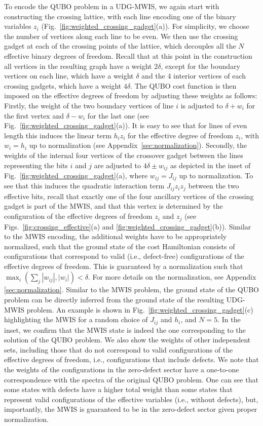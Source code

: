 To encode the QUBO problem in a UDG-MWIS, we again start with constructing the crossing lattice, with each line encoding one of the binary variables $z_i$ (Fig.~\ref{fig:weighted_crossing_gadget}(a)). For simplicity, we choose the number of vertices along each line to be even.
We then use the crossing gadget at each of the crossing points of the lattice, which decouples all the $N$ effective binary degrees of freedom. Recall that at this point in the construction all vertices in the resulting graph have a weight $2\delta$, except for the boundary vertices on each line, which have a weight $\delta$ and the 4 interior vertices of each crossing gadgets, which have a weight $4\delta$. The QUBO cost function is then imposed on the effective degrees of freedom by adjusting these weights as follows: Firstly, the weight of the two boundary vertices of line $i$ is adjusted to $\delta+ w_i$ for the first vertex and $\delta-w_i$ for the last one (see Fig.~\ref{fig:weighted_crossing_gadget}(a)). It is easy to see that for lines of even length this induces the linear term $h_i z_i$ for the effective degree of freedom $z_i$, with $w_i=h_i$ up to normalization (see Appendix~\ref{sec:normalization}). Secondly, the weights of the internal four vertices of the crossover gadget between the lines representing the bits $i$ and $j$ are adjusted to $4\delta\pm w_{ij}$ as depicted in the inset of Fig.~\ref{fig:weighted_crossing_gadget}(a), where $w_{ij}=J_{ij}$ up to normalization. To see that this induces the quadratic interaction term $J_{ij}z_iz_j$ between the two effective bits, recall that exactly one of the four ancillary vertices of the crossing gadget is part of the MWIS, and that this vertex is determined by the configuration of the effective degrees of freedom $z_i$ and $z_j$ (see Figs.~\ref{fig:crossing_effective}(a) and \ref{fig:weighted_crossing_gadget}(b)).  Similar to the MWIS encoding, the additional weights have to be appropriately normalized, such that the ground state of the cost Hamiltonian consists of configurations that correspond to valid (i.e., defect-free) configurations of the effective degrees of freedom. This is guaranteed by a normalization such that $\max_i(\sum_{j}|w_{ij}|,|w_i|)<\delta$. For more details on the normalization, see Appendix \ref{sec:normalization}.
Similar to the MWIS problem, the ground state of the QUBO problem can be directly inferred from the ground state of the resulting UDG-MWIS problem. An example is shown in Fig.~\ref{fig:weighted_crossing_gadget}(c) highlighting the MWIS for a random choice of $J_{ij}$ and $h_i$, and $N=5$. In the inset, we confirm that the MWIS state is indeed the one corresponding to the solution of the QUBO problem. We also show the weights of other independent sets, including those that do not correspond to valid configurations of the effective degrees of freedom, i.e., configurations that include defects. We note that the weights of the configurations in the zero-defect sector have a one-to-one correspondence with the spectra of the original QUBO problem. One can see that some states with defects have a higher total weight than some states that represent valid configurations of the effective variables (i.e., without defects), but, importantly, the MWIS is guaranteed to be in the zero-defect sector given proper normalization.

